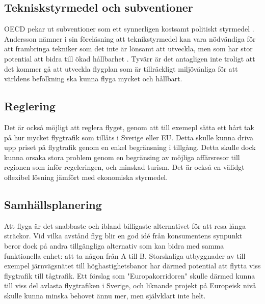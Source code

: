 \documentclass{article}
\begin{document}
\subsection{Tekniskstyrmedel och subventioner}

OECD pekar ut subventioner som ett synnerligen kostsamt politiskt styrmedel . Andersson nämner i sin föreläsning att teknikstyrmedel kan vara nödvändiga för att frambringa tekniker som det inte är lönsamt att utveckla, men som har stor potential att bidra till ökad hållbarhet . Tyvärr är det antagligen inte troligt att det kommer gå att utveckla flygplan som är tillräckligt miljövänliga för att världens befolkning ska kunna flyga mycket och hållbart.

\subsection{Reglering}

Det är också möjligt att reglera flyget, genom att till exemepl sätta ett hårt tak på hur mycket flygtrafik som tillåts i Sverige eller EU. Detta skulle kunna driva upp priset på flygtrafik genom en enkel begränsning i tillgång. Detta skulle dock kunna orsaka stora problem genom en begränsing av möjliga affärsresor till regionen som inför regeleringen, och minskad turism. Det är också en välidgt oflexibel lösning jämfört med ekonomiska styrmedel.

\subsection{Samhällsplanering}

Att flyga är det snabbaste och ibland billigaste alternativet för att resa långa sträckor. Vid vilka avstånd flyg blir en god idé från konsumentens synpunkt beror dock på andra tillgängliga alternativ som kan bidra med samma funktionella enhet: att ta någon från A till B. Storskaliga utbyggnader av till exempel järnvägsnätet till höghastighetsbanor har därmed potential att flytta viss flygtrafik till tågtrafik. Ett förslag som "Europakorridoren"  skulle därmed kunna till viss del avlasta flygtrafiken i Sverige, och liknande projekt på Europeisk nivå skulle kunna minska behovet ännu mer, men självklart inte helt.
\end{document}
